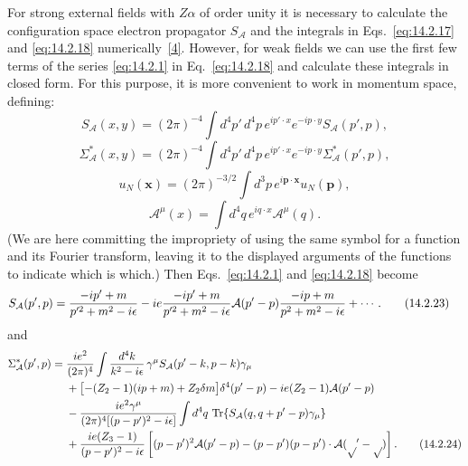 For strong external fields with $Z\alpha$ of order unity it is necessary to
calculate the configuration space electron propagator $S_{\mathcal A}$ and the
integrals in Eqs.~\eqref{eq:14.2.17} and \eqref{eq:14.2.18}
numerically~\hyperlink{ref:14.4}{[4]}. However, for weak fields we can use the
first few terms of the series \eqref{eq:14.2.1} in Eq.~\eqref{eq:14.2.18} and
calculate these integrals in closed form. For this purpose, it is more
convenient to work in momentum space, defining:
\begin{equation}
 S_{\mathcal A}(x,y)=(2\pi)^{-4}\int d^4p'\,d^4p\,
 e^{ip'\cdot x}e^{-ip\cdot y}S_{\mathcal A}(p',p),
 \tag{14.2.19}\label{eq:14.2.19}
\end{equation}
\begin{equation}
 \Sigma^*_{\mathcal A}(x,y)=(2\pi)^{-4}\int d^4p'\,d^4p\,
 e^{ip'\cdot x}e^{-ip\cdot y}\Sigma^*_{\mathcal A}(p',p),
 \tag{14.2.20}\label{eq:14.2.20}
\end{equation}
\begin{equation}
 u_N(\mathbf x)=(2\pi)^{-3/2}\int d^3p\,e^{i\mathbf p\cdot\mathbf x}u_N(\mathbf p),
 \tag{14.2.21}\label{eq:14.2.21}
\end{equation}
\begin{equation}
 \mathcal A^\mu(x)=\int d^4q\,e^{iq\cdot x}\mathcal A^\mu(q).
 \tag{14.2.22}\label{eq:14.2.22}
\end{equation}
(We are here committing the impropriety of using the same symbol for a function
and its Fourier transform, leaving it to the displayed arguments of the
functions to indicate which is which.) Then Eqs.~\eqref{eq:14.2.1} and
\eqref{eq:14.2.18} become
\begin{align}
 S_{\mathcal A}(p',p)={}&\frac{-i\sl{p}'+m}{p'^2+m^2-i\epsilon}
 -ie\frac{-i\sl{p}'+m}{p'^2+m^2-i\epsilon}
 \sl{\mathcal A}(p'-p)\frac{-i\sl{p}+m}{p^2+m^2-i\epsilon}
 +\cdots .
 \tag{14.2.23}\label{eq:14.2.23}
\end{align}
and
\begin{align}
 \Sigma^*_{\mathcal A}(p',p)={}&
 \frac{ie^2}{(2\pi)^4}\int\frac{d^4k}{k^2-i\epsilon}\,
 \gamma^\mu S_{\mathcal A}(p'-k,p-k)\gamma_\mu
 \notag\\
 &+\bigl[-(Z_2-1)(i\sl{p}+m)+Z_2\delta m\bigr]\delta^4(p'-p)
 -ie(Z_2-1)\sl{\mathcal A}(p'-p)
 \notag\\
 &-\frac{ie^2\gamma^\mu}{(2\pi)^4[(p-p')^2-i\epsilon]}
 \int d^4q\,\operatorname{Tr}\{S_{\mathcal A}(q,q+p'-p)\gamma_\mu\}
 \notag\\
 &+\frac{ie(Z_3-1)}{(p-p')^2-i\epsilon}
 \left[(p-p')^2\sl{\mathcal A}(p'-p)
 -(\sl{p}-\sl{p}')(p-p')\cdot\mathcal A(p'-p)\right].
 \tag{14.2.24}\label{eq:14.2.24}
\end{align}
